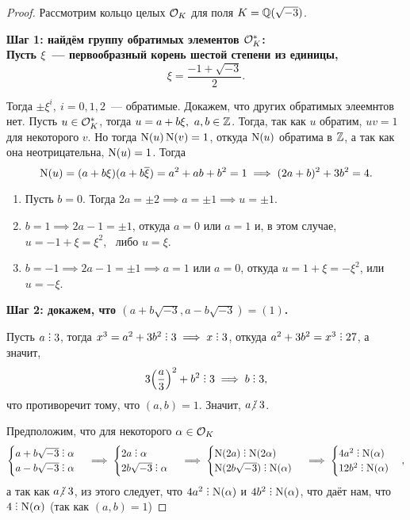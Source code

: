  	\begin{proof} Рассмотрим кольцо целых $\mathcal{O}_{K}$ для поля $K = \mathbb{Q}(\sqrt{-3})$. 

 		\bf{Шаг 1:} найдём группу обратимых элементов $\mathcal{O}_{K}^{*}$:\\

 		Пусть $\xi$~--- первообразный корень шестой степени из единицы, 
 		\[
			\xi = \frac{-1 + \sqrt{-3}}{2}.
 		\]	

 		Тогда $\pm \xi^i, \ i = 0, 1, 2$~--- обратимые. Докажем, что других обратимых элеемнтов нет.  Пусть $u \in \mathcal{O}_{K}^{*}$, тогда $u = a + b\xi, \ a, b \in \mathbb{Z}$. Тогда, так как $u$ обратим, $uv = 1$ для некоторого $v$. Но тогда $\operatorname{\mathrm{N}}(u)\operatorname{\mathrm{N}}(v) = 1$, откуда $\operatorname{\mathrm{N}}(u)$ обратима в $\mathbb{Z}$, а так как она неотрицательна, $\operatorname{\mathrm{N}}(u) = 1$. Тогда 
 		\[
 			\operatorname{\mathrm{N}}(u) = (a + b \xi)(a + b\overline{\xi}) = a^2 + ab + b^2 = 1 \implies (2a + b)^2 + 3b^2 = 4. 
 		\]
 		\begin{enumerate}
 			\item Пусть $b = 0$. Тогда $2a = \pm 2 \implies a = \pm 1 \implies u = \pm 1$. 

 			\item  $b = 1 \implies 2a - 1 = \pm 1$, откуда $a = 0$ или $a = 1$ и, в этом случае, $u = - 1 + \xi = \xi^2$, \ либо $u = \xi$.

 			\item $b = -1 \implies 2a - 1 = \pm 1 \implies a = 1$ или $a = 0$, откуда $u = 1 + \xi = -\xi^2$, или $u = -\xi$. 			
 		\end{enumerate}


 		\bf{Шаг 2:} докажем, что $(a + b\sqrt{-3}, a - b \sqrt{-3}) = (1)$.

 		Пусть $a \divby 3$, тогда $x^3 = a^2 + 3b^2 \divby 3 \implies x \divby 3$, откуда $a^2 + 3b^2 = x^3 \divby 27$, а значит, 
 		\[
 			3\lr*{\frac{a}{3}} ^2 + b^2 \divby 3 \implies b \divby 3,
 		\]
 		что противоречит тому, что $(a, b) = 1$. Значит, $a \notdivby 3$. 

 		Предположим, что для некоторого $\alpha \in \mathcal{O}_{K}$ 
 		\[
 			\begin{cases} a + b\sqrt{-3} \divby \alpha \\ a - b\sqrt{-3} \divby \alpha \end{cases} \implies \begin{cases} 2a \divby \alpha \\ 2b\sqrt{-3} \divby \alpha \end{cases} \implies \begin{cases} \Nm(2a) \divby \Nm(2\alpha) \\ \Nm(2b\sqrt{-3}) \divby \Nm(\alpha) \end{cases} \implies \begin{cases} 4a^2 \divby \Nm(\alpha) \\ 12b^2 \divby \Nm(\alpha) \end{cases},
 		\]
 		а так как $a \notdivby 3$, из этого следует, что $4a^2 \divby \Nm(\alpha)$ и $4b^2 \divby \Nm(\alpha)$, что даёт нам, что $4 \divby \Nm(\alpha)$ (так как $(a, b) = 1$)


\end{proof}

